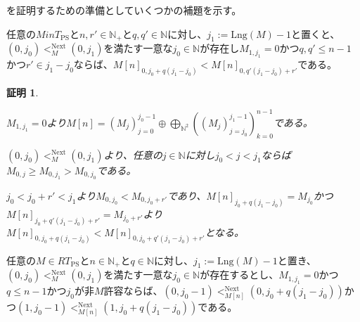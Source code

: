 \documentclass[dvipdfmx,uplatex]{jsarticle}
\theoremstyle{customnonumberbreakfortheorem}
\theoremstyle{customnonumberbreakforproof}
\newtheorem{hideableproof}{証明}
\begin{document}
を証明するための準備としていくつかの補題を示す。

\begin{lemma}[第\(0\)種型基本列の基本不等式]\label{第0種型基本列の基本不等式}
	任意の\(M in T_{\textrm{PS}}\)と\(n,r' \in \mathbb{N}_{+}\)と\(q,q' \in \mathbb{N}\)に対し、\(j_1 := \textrm{Lng}(M)-1\)と置くと、\((0,j_0) <_M^{\textrm{Next}} (0,j_1)\)を満たす一意な\(j_0 \in \mathbb{N}\)が存在し\(M_{1,j_1} = 0\)かつ\(q,q' \leq n-1\)かつ\(r' \in j_1-j_0\)ならば、\(M[n]_{0,j_0+q(j_1-j_0)} < M[n]_{0,q'(j_1-j_0)+r'}\)である。
\end{lemma}

\begin{hideableproof}
	\begin{indented}
		\item \(M_{1,j_1} = 0\)より\(M[n] = (M_j)_{j=0}^{j_0-1} \oplus \bigoplus_{\mathbb{N}^2} ((M_j)_{j=j_0}^{j_1-1})_{k=0}^{n-1}\)である。
		\item \((0,j_0) <_M^{\textrm{Next}} (0,j_1)\)より、任意の\(j \in \mathbb{N}\)に対し\(j_0 < j < j_1\)ならば\(M_{0,j} \geq M_{0,j_1} > M_{0,j_0}\)である。
		\item \(j_0 < j_0+r' < j_1\)より\(M_{0,j_0} < M_{0,j_0+r'}\)であり、\(M[n]_{j_0+q(j_1-j_0)} = M_{j_0}\)かつ\(M[n]_{j_0+q'(j_1-j_0)+r'} = M_{j_0+r'}\)より\(M[n]_{0,j_0+q(j_1-j_0)} < M[n]_{0,j_0+q'(j_1-j_0)+r'}\)となる。
	\end{indented}
\end{hideableproof}

\begin{lemma}[第\(0\)種型基本列の基本分岐規則]\label{第0種型基本列の基本分岐規則}
	任意の\(M \in RT_{\textrm{PS}}\)と\(n \in \mathbb{N}_{+}\)と\(q \in \mathbb{N}\)に対し、\(j_1 := \textrm{Lng}(M)-1\)と置き、\((0,j_0) <_M^{\textrm{Next}} (0,j_1)\)を満たす一意な\(j_0 \in \mathbb{N}\)が存在するとし、\(M_{1,j_1} = 0\)かつ\(q \leq n-1\)かつ\(j_0\)が非\(M\)許容ならば、\((0,j_0-1) <_{M[n]}^{\textrm{Next}} (0,j_0+q(j_1-j_0))\)かつ\((1,j_0-1) <_{M[n]}^{\textrm{Next}} (1,j_0+q(j_1-j_0))\)である。
\end{lemma}
\end{document}
